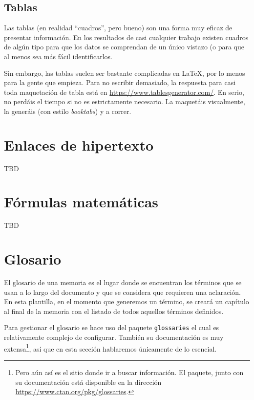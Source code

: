 \documentclass[%
    school=etsisi,%
    type=pfg,%
    degree=61CD,%
]{upm-report}
\begin{document}
\subsection{Tablas}

Las tablas (en realidad \enquote{cuadros}, pero bueno) son una forma muy eficaz de presentar información. En los resultados de casi cualquier trabajo existen cuadros de algún tipo para que los datos se comprendan de un único vistazo (o para que al menos sea más fácil identificarlos.

Sin embargo, las tablas suelen ser bastante complicadas en \LaTeX, por lo menos para la gente que empieza. Para no escribir demasiado, la respuesta para casi toda maquetación de tabla está en \href{https://www.tablesgenerator.com/}{https://www.tablesgenerator.com/}. En serio, no perdáis el tiempo si no es estrictamente necesario. La maquetáis visualmente, la generáis (con estilo \textit{booktabs}) y a correr.

\section{Enlaces de hipertexto}

TBD

\section{Fórmulas matemáticas}

TBD

\section{Glosario}
\label{s:glosario}

El glosario de una memoria es el lugar donde se encuentran los términos que se usan a lo largo del documento y que se considera que requieren una aclaración. En esta plantilla, en el momento que generemos un término, se creará un capítulo al final de la memoria con el listado de todos aquellos términos definidos.

Para gestionar el glosario se hace uso del paquete \texttt{glossaries} el cual es relativamente complejo de configurar. También su documentación es muy extensa\footnote{Pero aún así es el sitio donde ir a buscar información. El paquete, junto con su documentación está disponible en la dirección \href{https://www.ctan.org/pkg/glossaries}{https://www.ctan.org/pkg/glossaries}.}, así que en esta sección hablaremos únicamente de lo esencial.
\end{document}
